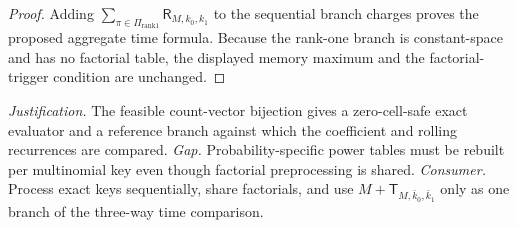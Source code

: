 \documentclass{article}
\begin{document}
\begin{proof}
Adding \(\sum_{\pi\in\Pi_{\mathrm{rank1}}}\mathsf R_{M,k_0,k_1}\) to the sequential branch charges proves the proposed aggregate time formula. Because the rank-one branch is constant-space and has no factorial table, the displayed memory maximum and the factorial-trigger condition are unchanged.
\end{proof}
\par\smallskip\noindent \textit{Justification.} The feasible count-vector bijection gives a zero-cell-safe exact evaluator and a reference branch against which the coefficient and rolling recurrences are compared. \textit{Gap.} Probability-specific power tables must be rebuilt per multinomial key even though factorial preprocessing is shared. \textit{Consumer.} Process exact keys sequentially, share factorials, and use \(M+\mathsf T_{M,\bar k_0,\bar k_1}\) only as one branch of the three-way time comparison.
\end{document}
